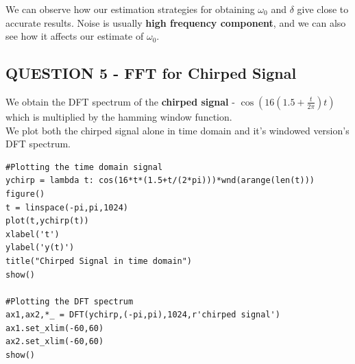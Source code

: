 \documentclass[11pt, a4paper]{article}
\begin{document}
{
We can observe how our estimation strategies for obtaining $\omega_{0}$ and $\delta$ give close to accurate results. Noise is usually \textbf{high frequency component}, and we can also see how it affects our estimate of $\omega_{0}$.
}


\subsection{QUESTION 5 - FFT for Chirped Signal}
{
We obtain the DFT spectrum of the \textbf{chirped signal} - $\cos(16(1.5 + \frac{t}{2\pi})t)$ which is multiplied by the hamming window function.
\\We plot both the chirped signal alone in time domain and it's windowed version's DFT spectrum.
}
\begin{verbatim}
#Plotting the time domain signal
ychirp = lambda t: cos(16*t*(1.5+t/(2*pi)))*wnd(arange(len(t)))
figure()
t = linspace(-pi,pi,1024)
plot(t,ychirp(t))
xlabel('t')
ylabel('y(t)')
title("Chirped Signal in time domain")
show()

#Plotting the DFT spectrum
ax1,ax2,*_ = DFT(ychirp,(-pi,pi),1024,r'chirped signal')
ax1.set_xlim(-60,60)
ax2.set_xlim(-60,60)
show()
\end{verbatim}
\end{document}
